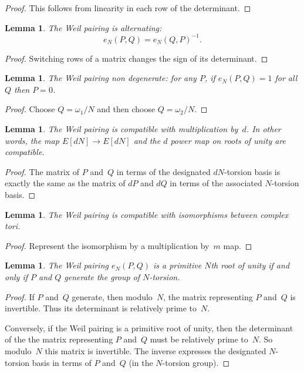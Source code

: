 \documentclass{article}
\theoremstyle{plain}
\newtheorem{lemma}[theorem]{Lemma}
\theoremstyle{definition}
\theoremstyle{remark}
\begin{document}
\begin{proof}
This follows from linearity in each row of the determinant.
\end{proof}

\begin{lemma}
The Weil pairing is alternating:
$$e_N(P, Q) = e_N(Q, P)^{-1}.$$
\end{lemma}

\begin{proof}
Switching rows of a matrix changes the sign of its determinant.
\end{proof}

\begin{lemma}
The Weil pairing non degenerate: for any $P$, if 
$e_N(P, Q) = 1$ for all $Q$ then $P = 0$.
\end{lemma}

\begin{proof}
Choose $Q = \omega_1/N$ and then choose $Q = \omega_2/N$.
\end{proof}

\begin{lemma}
The Weil pairing is compatible with multiplication by~$d$. In other words,
the map $E[dN] \to E[dN]$ and the $d$ power map on roots of unity are compatible.
\end{lemma}

\begin{proof}
The matrix of $P$ and~$Q$ in terms of the designated $dN$-torsion basis is
exactly the same as the matrix of $dP$ and $dQ$ in terms of the associated $N$-torsion 
basis.
\end{proof}


\begin{lemma}
The Weil pairing is compatible with isomorphisms between complex tori.
\end{lemma}

\begin{proof}
Represent the isomorphism by a multiplication by~$m$ map.
\end{proof}

\begin{lemma}
The Weil pairing $e_N(P, Q)$ is a primitive $N$th root of unity if and only
if $P$ and $Q$ generate the group of $N$-torsion.
\end{lemma}

\begin{proof}
If $P$ and~$Q$ generate, then modulo~$N$, the matrix representing $P$ and~$Q$ is
invertible. Thus its determinant is relatively prime to~$N$. 

Conversely, if the Weil pairing is a primitive root of unity, then the determinant of the 
 the matrix representing $P$ and~$Q$ must be relatively prime to~$N$. So modulo~$N$
 this matrix is invertible. The inverse expresses the designated $N$-torsion basis
 in terms of $P$ and~$Q$ (in the $N$-torsion group).
\end{proof}
\end{document}
